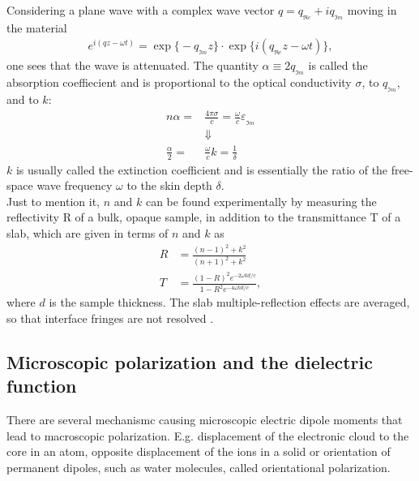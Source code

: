Considering a plane wave with a complex wave vector $q = q\!_{_{\Re\! e}} + iq\!_{_{\Im\! m}}$ moving in the material
\cite[p.~402]{Griffiths}
\begin{align}
  e^{i(q z - \omega t )} 
  = \exp\big\{-q\!_{_{\Im\! m}} z\big\} \cdot \exp\big\{i( q\!_{_{\Re\! e}} z - \omega t ) \big\},
\end{align}
one sees that the wave is attenuated. 
The quantity $\alpha \equiv 2 q\!_{_{\Im\! m}}$ is called the absorption coeffiecient
and is proportional to the optical conductivity $\sigma$, to $q\!_{_{\Im\! m}}$, and to $k$:
\begin{align}
   n\alpha = &\frac{4 \pi \sigma}{c} = \frac{\omega}{c} \varepsilon\!_{_{\Im\! m}}\\
                     &\Downarrow \\
   \frac{\alpha}{2} = &\frac{\omega}{c}k = \frac{1}{\delta}
\end{align}
$k$ is usually called the extinction coefficient and is essentially the ratio of the
free-space wave frequency $\omega$ to the skin depth $\delta$.\\
Just to mention it, $n$ and $k$ can be found experimentally by measuring the reflectivity R of a bulk, opaque sample,
in addition to the transmittance T of a slab, which are given in terms of $n$ and $k$ as
\begin{align}
   R &= \frac{(n-1)^2 + k^2}{(n+1)^2 + k^2} \\
   T &= \frac{ (1-R)^2 e^{-2\omega k d / c} }{ 1-R^2 e^{-4\omega k d / c} },
\end{align}
where $d$ is the sample thickness. The slab multiple-reflection effects are averaged,
so that interface fringes are not resolved \cite[p.~169-170]{Jensen1985}.




\subsection{Microscopic polarization and the dielectric function}
There are several mechanismc causing microscopic electric dipole moments that lead to macroscopic 
polarization. E.g. displacement of the electronic cloud to the core in an atom, 
opposite displacement of the ions in a solid or
orientation of permanent dipoles, such as water molecules, called orientational polarization.


